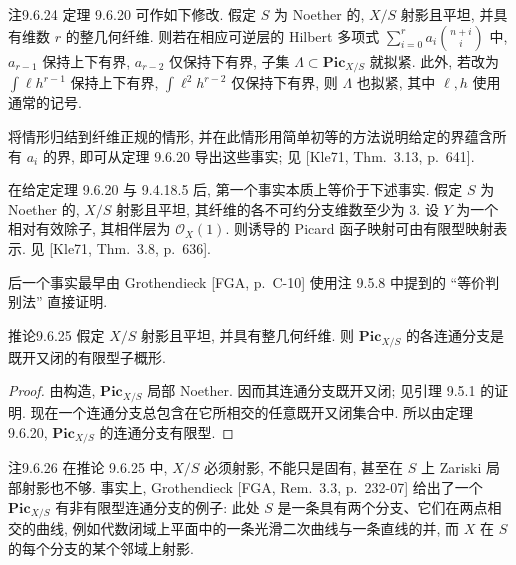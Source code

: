 \begin{origstatement}{注}{9.6.24}\label{ch09s6:rem9624}
定理 9.6.20 可作如下修改. 假定 $S$ 为 Noether 的, $X/S$ 射影且平坦, 并具有维数 $r$ 的整几何纤维. 则若在相应可逆层的 Hilbert 多项式 $\sum_{i=0}^ra_i\binom{n+i}{i}$ 中, $a_{r-1}$ 保持上下有界, $a_{r-2}$ 仅保持下有界, 子集 $\Lambda\subset\mathbf{Pic}_{X/S}$ 就拟紧. 此外, 若改为 $\int\ell h^{r-1}$ 保持上下有界, $\int\ell^2h^{r-2}$ 仅保持下有界, 则 $\Lambda$ 也拟紧, 其中 $\ell,h$ 使用通常的记号.

将情形归结到纤维正规的情形, 并在此情形用简单初等的方法说明给定的界蕴含所有 $a_i$ 的界, 即可从定理 9.6.20 导出这些事实; 见 [Kle71, Thm.~3.13, p.~641].

在给定定理 9.6.20 与 9.4.18.5 后, 第一个事实本质上等价于下述事实. 假定 $S$ 为 Noether 的, $X/S$ 射影且平坦, 其纤维的各不可约分支维数至少为 3. 设 $Y$ 为一个相对有效除子, 其相伴层为 $\mathcal O_X(1)$. 则诱导的 Picard 函子映射可由有限型映射表示. 见 [Kle71, Thm.~3.8, p.~636].

后一个事实最早由 Grothendieck [FGA, p.~C-10] 使用注 9.5.8 中提到的 ``等价判别法'' 直接证明.
\end{origstatement}

\begin{origstatement}{推论}{9.6.25}\label{ch09s6:cor9625}
假定 $X/S$ 射影且平坦, 并具有整几何纤维. 则 $\mathbf{Pic}_{X/S}$ 的各连通分支是既开又闭的有限型子概形.
\end{origstatement}
\begin{proof}
由构造, $\mathbf{Pic}_{X/S}$ 局部 Noether. 因而其连通分支既开又闭; 见引理 9.5.1 的证明. 现在一个连通分支总包含在它所相交的任意既开又闭集合中. 所以由定理 9.6.20, $\mathbf{Pic}_{X/S}$ 的连通分支有限型.
\end{proof}

\begin{origstatement}{注}{9.6.26}\label{ch09s6:rem9626}
在推论 9.6.25 中, $X/S$ 必须射影, 不能只是固有, 甚至在 $S$ 上 Zariski 局部射影也不够. 事实上, Grothendieck [FGA, Rem.~3.3, p.~232-07] 给出了一个 $\mathbf{Pic}_{X/S}$ 有非有限型连通分支的例子: 此处 $S$ 是一条具有两个分支、它们在两点相交的曲线, 例如代数闭域上平面中的一条光滑二次曲线与一条直线的并, 而 $X$ 在 $S$ 的每个分支的某个邻域上射影.
\end{origstatement}

